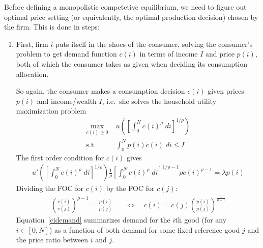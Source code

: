 \documentclass[12pt]{article}
\theoremstyle{plain}
\theoremstyle{definition}
\theoremstyle{remark}
\newcommand{\intzN}{\int_0^N}
\begin{document}
Before defining a monopolistic competetive equilibrium, we need to
figure out optimal price setting (or equivalently, the optimal
production decision) chosen by the firm. This is done in steps:
\begin{enumerate}
  \item First, firm $i$ puts itself in the shoes of the consumer,
    solving the consumer's problem to get demand function $c(i)$ in
    terms of income $I$ and price $p(i)$, both of which the consumer
    takes as given when deciding its consumption allocation.

    So again, the consumer makes a consumption decision $c(i)$ given
    prices $p(i)$ and income/wealth $I$, i.e.\ she solves the household
    utility maximization problem
    \begin{align*}
      \max_{c(i) \geq 0}
        & \; u\left(
          \left[ \int_0^N c(i)^\rho \; di \right]^{1/\rho}
        \right)\\
      \text{s.t} & \;
        \intzN p(i) c(i) \; di \leq I
    \end{align*}
    The first order condition for $c(i)$ gives
    \begin{align*}
      u'\left(
        \left[ \int_0^N c(i)^\rho \; di \right]^{1/\rho}
      \right)
      \frac{1}{\rho}
      \left[ \int_0^N c(i)^\rho \; di \right]^{1/\rho-1}
      \rho c(i)^{\rho-1}
      = \lambda p(i)
    \end{align*}
    Dividing the FOC for $c(i)$ by the FOC for $c(j)$:
    \begin{align}
      \left(
      \frac{c(i)}{c(j)}
      \right)^{\rho-1}
      =
      \frac{p(i)}{p(j)}
      &\quad \iff \quad
      c(i)
      =
      c(j)
      \left(
      \frac{p(i)}{p(j)}
      \right)^{\frac{1}{\rho-1}}
      \label{cidemand}
    \end{align}
    Equation~\ref{cidemand} summarizes demand for the $i$th good (for
    any $i\in[0,N]$) as a function of both demand for some fixed
    reference good $j$ and the price ratio between $i$ and $j$.


\end{enumerate}
\end{document}
